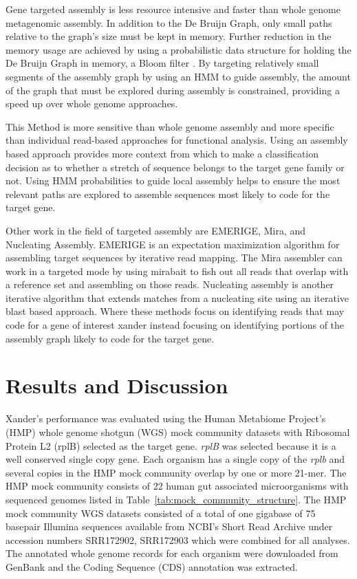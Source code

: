 \documentclass[10pt]{bmc_article}
\newenvironment{bmcformat}{\begin{raggedright}\baselineskip20pt\sloppy\setboolean{publ}{false}}{\end{raggedright}\baselineskip20pt\sloppy}
\begin{document}
\begin{bmcformat}
Gene targeted assembly is less resource intensive and faster than whole genome metagenomic assembly.  In addition to the De Bruijn Graph, only small paths relative to the graph's size must be kept in memory.  Further reduction in the memory usage are achieved by using a probabilistic data structure for holding the De Bruijn Graph in memory, a Bloom filter \cite{Bloom1970,Pell30072012}.  By targeting relatively small segments of the assembly graph by using an HMM to guide assembly, the amount of the graph that must be explored during assembly is constrained, providing a speed up over whole genome approaches.

This Method is more sensitive than whole genome assembly and more specific than individual read-based approaches for functional analysis.  Using an assembly based approach provides more context from which to make a classification decision as to whether a stretch of sequence belongs to the target gene family or not.  Using HMM probabilities to guide local assembly helps to ensure the most relevant paths are explored to assemble sequences most likely to code for the target gene.

Other work in the field of targeted assembly are EMERIGE, Mira, and Nucleating Assembly.  EMERIGE is an expectation maximization algorithm for assembling target sequences by iterative read mapping.  The Mira assembler can work in a targeted mode by using mirabait to fish out all reads that overlap with a reference set and assembling on those reads.  Nucleating assembly is another iterative algorithm that extends matches from a nucleating site using an iterative blast based approach.  Where these methods focus on identifying reads that may code for a gene of interest xander
 instead focusing on identifying portions of the assembly graph likely to code for the target gene.
\section*{Results and Discussion}
Xander's performance was evaluated using the Human Metabiome Project's (HMP) whole genome shotgun (WGS) mock community datasets with Ribosomal Protein L2 (rplB) selected as the target gene.  \emph{rplB} was selected because it is a well conserved single copy gene.  Each organism has a single copy of the \emph{rplb} and several copies in the HMP mock community overlap by one or more 21-mer. The HMP mock community consists of 22 human gut associated microorganisms with sequenced genomes listed in Table~\ref{tab:mock_community_structure}.  The HMP mock community WGS datasets consisted of a total of one gigabase of 75 basepair Illumina sequences available from NCBI's Short Read Archive under accession numbers SRR172902, SRR172903 which were combined for all analyses.  The annotated whole genome records for each organism were downloaded from GenBank and the Coding Sequence (CDS) annotation was extracted.


\end{bmcformat}
\end{document}
